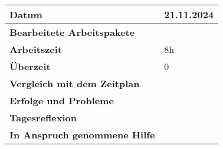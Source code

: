 \begin{longtable}{p{}|p{}}
	\hline
	\textbf{Datum}                       & 21.11.2024 \\
	\hline
	\textbf{Bearbeitete Arbeitspakete}   &  \\
	\hline
	\textbf{Arbeitszeit}                 & 8h \\
	\hline
	\textbf{Überzeit}                    & 0 \\
	\hline
	\textbf{Vergleich mit dem Zeitplan}  & 
	\\
	\hline
	\textbf{Erfolge und Probleme}        & 
	\\
	\hline
	\textbf{Tagesreflexion}              & 
	\\
	\hline
	\textbf{In Anspruch genommene Hilfe} & \\
	\hline
\end{longtable}\label{tab:arbeitsprotokoll-tag10}
\newpage


